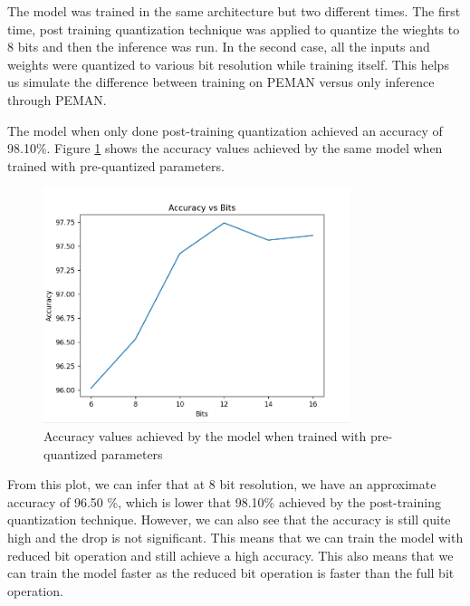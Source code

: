 The model was trained in the same architecture but two different times. The first time, post training quantization technique was applied to quantize the wieghts to 8 bits and then the inference was run. In the second case, all the inputs and weights were quantized to various bit resolution while training itself. This helps us simulate the difference between training on PEMAN versus only inference through PEMAN.

The model when only done post-training quantization achieved an accuracy of 98.10\%. Figure \ref{trainingOnPeman} shows the accuracy values achieved by the same model when trained with pre-quantized parameters.

\begin{figure}
	\centering
	\includegraphics[width=0.8\textwidth]{images/trainingOnPeman.png}
	\caption{Accuracy values achieved by the model when trained with pre-quantized parameters}
	\label{trainingOnPeman}
\end{figure}

From this plot, we can infer that at 8 bit resolution, we have an approximate accuracy of 96.50 \%, which is lower that 98.10\% achieved by the post-training quantization technique. However, we can also see that the accuracy is still quite high and the drop is not significant. This means that we can train the model with reduced bit operation and still achieve a high accuracy. This also means that we can train the model faster as the reduced bit operation is faster than the full bit operation.

